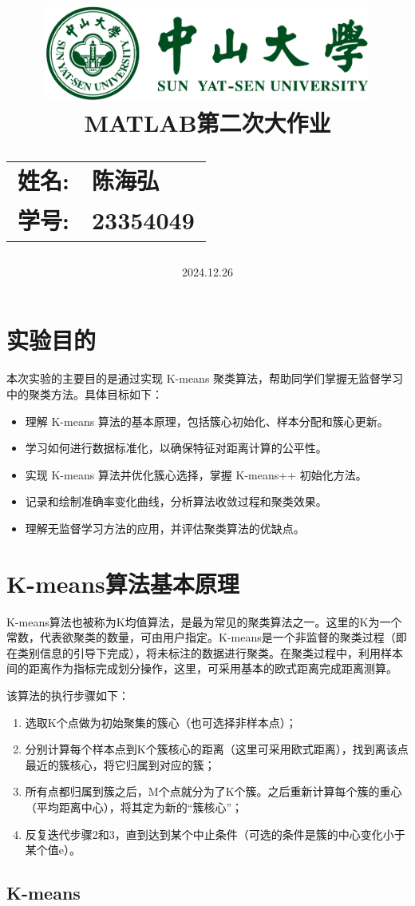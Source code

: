 \documentclass[12pt,a4paper,oneside]{article}
\author{}
\title{
    \vspace*{-2cm} %
    \includegraphics[width=0.8\textwidth]{SYSULogo.pdf} \\[1em]
    \vfill %
    \LARGE \textbf{MATLAB第二次大作业} \\[1em]
    \Large
    \begin{tabular}{rl}
        \textbf{姓名:} & \textbf{陈海弘} \\
        \textbf{学号:} & \textbf{23354049}
    \end{tabular}
    \vfill %
}
\date{\Large 2024.12.26}
\begin{document}
\maketitle

\newpage
\tableofcontents
\newpage
\section{实验目的}
\qquad 本次实验的主要目的是通过实现 K-means 聚类算法，帮助同学们掌握无监督学习中的聚类方法。具体目标如下：

\begin{itemize}
    \item 理解 K-means 算法的基本原理，包括簇心初始化、样本分配和簇心更新。
    \item 学习如何进行数据标准化，以确保特征对距离计算的公平性。
    \item 实现 K-means 算法并优化簇心选择，掌握 K-means++ 初始化方法。
    \item 记录和绘制准确率变化曲线，分析算法收敛过程和聚类效果。
    \item 理解无监督学习方法的应用，并评估聚类算法的优缺点。
\end{itemize}
\section{K-means算法基本原理}
\qquad K-means算法也被称为K均值算法，是最为常见的聚类算法之一。这里的K为一个常数，代表欲聚类的数量，可由用户指定。K-means是一个非监督的聚类过程（即在类别信息的引导下完成），将未标注的数据进行聚类。在聚类过程中，利用样本间的距离作为指标完成划分操作，这里，可采用基本的欧式距离完成距离测算。

该算法的执行步骤如下：

\begin{enumerate}
    \item 选取K个点做为初始聚集的簇心（也可选择非样本点）；
    \item 分别计算每个样本点到K个簇核心的距离（这里可采用欧式距离），找到离该点最近的簇核心，将它归属到对应的簇；
    \item 所有点都归属到簇之后，M个点就分为了K个簇。之后重新计算每个簇的重心（平均距离中心），将其定为新的“簇核心”；
    \item 反复迭代步骤2和3，直到达到某个中止条件（可选的条件是簇的中心变化小于某个值e）。
\end{enumerate}

\subsection{K-means}
\end{document}

